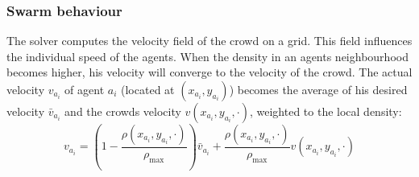 \documentclass{article}
\begin{document}
\subsubsection{Swarm behaviour}
The solver computes the velocity field of the crowd on a grid. This field influences the individual speed of the agents. When the density in an agents neighbourhood becomes higher, his velocity will converge to the velocity of the crowd. The actual velocity $v_{a_i}$ of agent $a_i$ (located at $(x_{a_i},y_{a_i})$) becomes the average of his desired velocity $\bar{v}_{a_i}$ and the crowds velocity $v(x_{a_i},y_{a_i},\cdot)$, weighted to the local density:
\begin{equation}
	v_{a_i} = \left(1-\frac{\rho(x_{a_i},y_{a_i},\cdot)}{\rho_{\max}}\right)\bar{v}_{a_i}+\frac{\rho(x_{a_i},y_{a_i},\cdot)}{\rho_{\max}}v(x_{a_i},y_{a_i},\cdot)
	\label{eq:dens_velo}
\end{equation}
\end{document}
